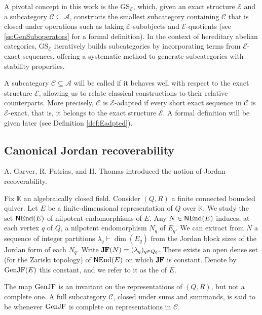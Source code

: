 A pivotal concept in this work is the  \(\text{GS}_\mathcal{E}\), which, given an exact structure \(\mathcal{E}\) and a subcategory \(\mathscr{C} \subseteq \mathscr{A}\), constructs the smallest subcategory containing \(\mathscr{C}\) that is closed under operations such as taking \(\mathcal{E}\)-subobjects and \(\mathcal{E}\)-quotients (see \cref{ss:GenSuboperators} for a formal definition). In the context of hereditary abelian categories, \(\text{GS}_\mathcal{E}\) iteratively builds subcategories by incorporating terms from \(\mathcal{E}\)-exact sequences, offering a systematic method to generate subcategories with stability properties. 

A subcategory $\mathscr{C} \subseteq \mathscr{A}$ will be called
 if it behaves well with respect to the exact
structure $\mathcal{E}$, allowing us to relate classical constructions to
their relative counterparts. More precisely, $\mathscr{C}$ is
$\mathcal{E}$-adapted if every short exact sequence in $\mathscr{C}$ is
$\mathcal{E}$-exact, that is, it belongs to the exact structure $\mathcal{E}$.
A formal definition will be given later (see Definition \ref{def:Eadpted}).



\subsection{Canonical Jordan recoverability}
\label{ss:CJRintro}

A. Garver, R. Patrias, and H. Thomas \cite{GPT19} introduced the notion of Jordan recoverability. 

Fix $\mathbb{K}$ an algebraically closed field. Consider $(Q,R)$ a finite connected bounded quiver. Let $E$ be a finite-dimensional representation of $Q$ over $\mathbb{K}$. We study the set $\operatorname{\mathsf{N}End}(E)$ of nilpotent endomorphisms of $E$. Any $N \in \operatorname{\mathsf{N}End}(E)$ induces, at each vertex $q$ of $Q$, a nilpotent endomorphism $N_q$ of $E_q$. We can extract from $N$ a sequence of integer partitions $\lambda_q \vdash \dim(E_q)$ from the Jordan block sizes of the Jordan form of each $N_q$. Write $\pmb{\operatorname{JF}}(N) = (\lambda_q)_{q \in Q_0}$. There exists an open dense set (for the Zariski topology) of $\operatorname{\mathsf{N}End}(E)$ on which $\pmb{\operatorname{JF}}$ is constant. Denote by $\operatorname{GenJF}(E)$ this constant, and we refer to it as the  of $E$.

The map $\operatorname{GenJF}$ is an invariant on the representations of $(Q,R)$, but not a complete one. A full subcategory $\mathscr{C}$, closed under sums and summands, is said to be  whenever $\operatorname{GenJF}$ is complete on representations in $\mathscr{C}$.

